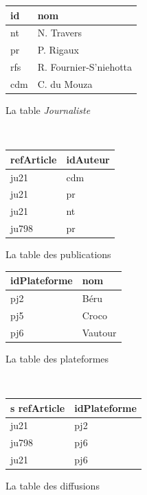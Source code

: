 \documentclass[11pt,a4paper]{article}
\newcommand{\cle}[1]{\textbf{#1}}
\def\tble#1{\textit{#1}}
\begin{document}
\begin{center}
\begin{minipage}[b]{8cm}
\begin{tabular}{l|l}
\cle{id} & nom \\
\hline
nt & N. Travers  \\
pr & P. Rigaux  \\
rfs & R. Fournier-S'niehotta \\
cdm & C. du Mouza \\
\hline
\end{tabular}

\centerline{La table \tble{Journaliste}}
\end{minipage} \hspace*{1cm} \
\begin{minipage}[b]{6cm}
\begin{tabular}{l|l}
refArticle  & idAuteur \\
\hline
ju21 & cdm \\
ju21 & pr \\
ju21  & nt \\
ju798 & pr \\
\hline
\end{tabular}
\centerline{La table des publications}
\end{minipage} 

\vspace*{0.2cm}
\begin{minipage}[b]{6cm}
\begin{tabular}{l|l}
\cle{idPlateforme} & nom\\
\hline
pj2 & Béru\\
pj5 & Croco \\
pj6 & Vautour \\
\hline
\end{tabular}
\centerline{La table des plateformes}
\end{minipage} \hspace*{1cm} \
\begin{minipage}[b]{6cm}
\begin{tabular}{l|l}s
refArticle  & idPlateforme \\
\hline
ju21 & pj2 \\
ju798 & pj6 \\
ju21  & pj6 \\
\hline
\end{tabular}
\centerline{La table des diffusions}
\end{minipage} 
\end{center}
\end{document}
